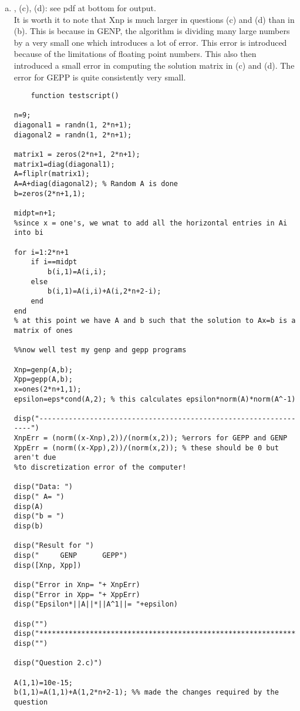 \begin{enumerate}[1)]
\begin{enumerate}[(a)]
	\item, (c), (d): see pdf at bottom for output. \\
	
	It is worth it to note that Xnp is much larger in questions (c) and (d) than in (b). This is because in GENP, the algorithm is dividing many large numbers by a very small one which introduces a lot of error. This error is introduced because of the limitations of floating point numbers. This also then introduced a small error in computing the solution matrix in (c) and (d). 
The error for GEPP is quite consistently very small. 
		
	\begin{verbatim}
	function testscript()

n=9;
diagonal1 = randn(1, 2*n+1);
diagonal2 = randn(1, 2*n+1);

matrix1 = zeros(2*n+1, 2*n+1);
matrix1=diag(diagonal1);
A=fliplr(matrix1);
A=A+diag(diagonal2); % Random A is done
b=zeros(2*n+1,1);

midpt=n+1;
%since x = one's, we wnat to add all the horizontal entries in Ai into bi

for i=1:2*n+1
    if i==midpt
        b(i,1)=A(i,i);
    else
        b(i,1)=A(i,i)+A(i,2*n+2-i);
    end
end
% at this point we have A and b such that the solution to Ax=b is a matrix of ones

%%now well test my genp and gepp programs

Xnp=genp(A,b); 
Xpp=gepp(A,b); 
x=ones(2*n+1,1);
epsilon=eps*cond(A,2); % this calculates epsilon*norm(A)*norm(A^-1)

disp("-----------------------------------------------------------------")
XnpErr = (norm((x-Xnp),2))/(norm(x,2)); %errors for GEPP and GENP
XppErr = (norm((x-Xpp),2))/(norm(x,2)); % these should be 0 but aren't due 
%to discretization error of the computer!

disp("Data: ")
disp(" A= ")
disp(A)
disp("b = ")
disp(b)

disp("Result for ")
disp("     GENP      GEPP")
disp([Xnp, Xpp])

disp("Error in Xnp= "+ XnpErr)
disp("Error in Xpp= "+ XppErr)
disp("Epsilon*||A||*||A^1||= "+epsilon)

disp("")
disp("*****************************************************************")
disp("")

disp("Question 2.c)")

A(1,1)=10e-15;
b(1,1)=A(1,1)+A(1,2*n+2-1); %% made the changes required by the question


\end{verbatim}
\end{enumerate}
\end{enumerate}
